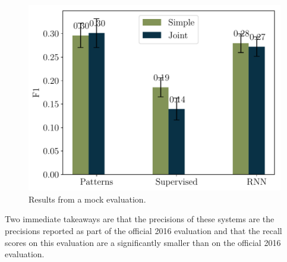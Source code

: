 \begin{figure}[t]
  \centering
  \includegraphics[width=\columnwidth]{figures/kbp2016/kbp2016_f1}
  \caption{\label{fig:evaluation-results} Results from a mock evaluation.}
\end{figure}

%  

Two immediate takeaways are that the precisions of these systems are  the precisions reported as part of the official 2016 evaluation and that the recall scores on this evaluation are a significantly smaller than on the official 2016 evaluation.
